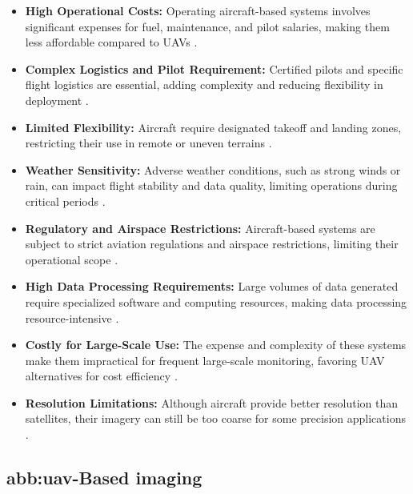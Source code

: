 \begin{itemize}
    \item \textbf{High Operational Costs:} Operating aircraft-based systems involves significant expenses for fuel, maintenance, and pilot salaries, making them less affordable compared to UAVs \parencite{delavarpour2021technical, phang2023from}.
    
    \item \textbf{Complex Logistics and Pilot Requirement:} Certified pilots and specific flight logistics are essential, adding complexity and reducing flexibility in deployment \parencite{adao2017hyperspectral}.
    
    \item \textbf{Limited Flexibility:} Aircraft require designated takeoff and landing zones, restricting their use in remote or uneven terrains \parencite{delavarpour2021technical}.
    
    \item \textbf{Weather Sensitivity:} Adverse weather conditions, such as strong winds or rain, can impact flight stability and data quality, limiting operations during critical periods \parencite{delavarpour2021technical}.
    
    \item \textbf{Regulatory and Airspace Restrictions:} Aircraft-based systems are subject to strict aviation regulations and airspace restrictions, limiting their operational scope \parencite{delavarpour2021technical}.
    
    \item \textbf{High Data Processing Requirements:} Large volumes of data generated require specialized software and computing resources, making data processing resource-intensive \parencite{delavarpour2021technical}.
    
    \item \textbf{Costly for Large-Scale Use:} The expense and complexity of these systems make them impractical for frequent large-scale monitoring, favoring UAV alternatives for cost efficiency \parencite{phang2023from}.
    
    \item \textbf{Resolution Limitations:} Although aircraft provide better resolution than satellites, their imagery can still be too coarse for some precision applications \parencite{adao2017hyperspectral}.
  \end{itemize}
  
\subsection{\gls{abb:uav}-Based imaging}

